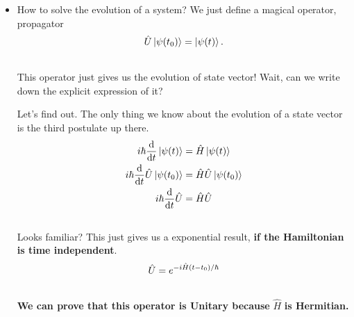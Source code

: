 \documentclass[letterpaper,10pt,english]{sphinxmanual}
\def\d{{\rm d}}
\newcommand{\ket}[1]{\left| #1\right\rangle}
\begin{document}
\begin{itemize}
\item {} 
How to solve the evolution of a system?
We just define a magical operator, propagator
\begin{gather}
\begin{split}\hat U \ket{\psi(t_0)} = \ket{\psi(t)} .\end{split}\notag\\\begin{split}\end{split}\notag
\end{gather}
This operator just gives us the evolution of state vector! Wait, can we write down the explicit expression of it?

Let's find out. The only thing we know about the evolution of a state vector is the third postulate up there.
\begin{gather}
\begin{split}i\hbar \frac{\d }{\d t}\ket{\psi(t)} & =  \hat H \ket{\psi(t)} \\
i\hbar \frac{\d }{\d t}\hat U \ket{\psi(t_0)} & =  \hat H \hat U \ket{\psi(t_0)} \\
i\hbar \frac{\d }{\d t}\hat U & =  \hat H \hat U\end{split}\notag\\\begin{split}\end{split}\notag
\end{gather}
Looks familiar? This just gives us a exponential result, \textbf{if the Hamiltonian is time independent}.
\begin{gather}
\begin{split}\hat U = e^{- i \hat H (t-t_0)/\hbar}\end{split}\notag\\\begin{split}\end{split}\notag
\end{gather}
\textbf{We can prove that this operator is Unitary because} $\hat H$ \textbf{is Hermitian.}


\end{itemize}
\end{document}
